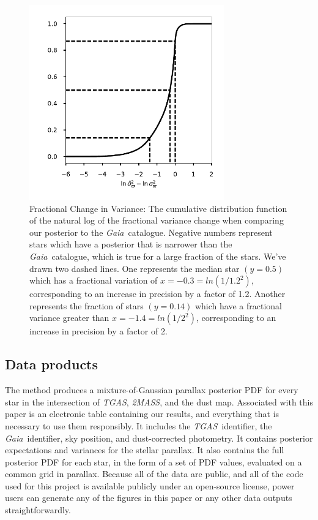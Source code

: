 \documentclass[modern]{aastex61}
\newcommand{\acronym}[1]{{\small{#1}}}
\newcommand{\project}[1]{\textsl{#1}}
\newcommand{\tgas}{\project{\acronym{TGAS}}}
\newcommand{\tmass}{\project{\acronym{2MASS}}}
\newcommand{\gaia}{\project{Gaia}}
\begin{document}
\begin{figure}
\centering
\includegraphics[width=0.75\textwidth]{deltaCDF.pdf}
\caption{Fractional Change in Variance: The cumulative distribution function of the natural log of the fractional variance change when comparing our posterior to the \gaia\ catalogue. Negative numbers represent stars which have a posterior that is narrower than the \gaia\ catalogue, which is true for a large fraction of the stars. We've drawn two dashed lines. One represents the median star $(y=0.5)$ which has a fractional variation of $x=-0.3=ln(1/1.2^2)$, corresponding to an increase in precision by a factor of 1.2. Another represents the fraction of stars $(y=0.14)$ which have a fractional variance greater than $x=-1.4=ln(1/2^2)$, corresponding to an increase in precision by a factor of 2.}
\label{fig:deltaCDF}
\end{figure}

\subsection{Data products}

The method produces a mixture-of-Gaussian parallax posterior PDF for every
star in the intersection of \tgas, \tmass, and the dust map.
Associated with this paper is an electronic table containing our results, and everything
that is necessary to use them responsibly.
It includes the \tgas\ identifier, the \gaia\ identifier, sky position, and dust-corrected
photometry.
It contains posterior expectations and variances for the stellar parallax.
It also contains the full posterior PDF for each star, in the form of a set of PDF values,
evaluated on a common grid in parallax.
Because all of the data are public, and all of the code used for this project is available
publicly under an open-source license, power users can generate any of the figures in this
paper or any other data outputs straightforwardly.
\end{document}
